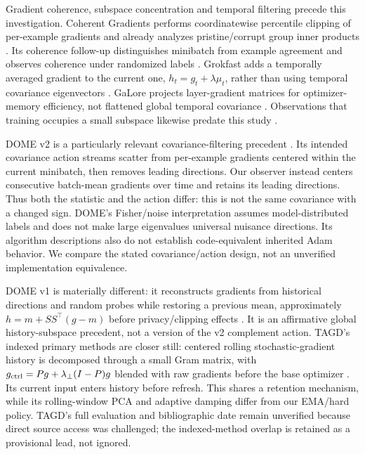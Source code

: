 \documentclass[10pt]{article}
\begin{document}
Gradient coherence, subspace concentration and temporal filtering precede this investigation. Coherent Gradients performs coordinatewise percentile clipping of per-example gradients and already analyzes pristine/corrupt group inner products \citep{chatterjee2020coherent}. Its coherence follow-up distinguishes minibatch from example agreement and observes coherence under randomized labels \citep{chatterjee2020making}. Grokfast adds a temporally averaged gradient to the current one, $h_t=g_t+\lambda\mu_t$, rather than using temporal covariance eigenvectors \citep{lee2024grokfast}. GaLore projects layer-gradient matrices for optimizer-memory efficiency, not flattened global temporal covariance \citep{zhao2024galore}. Observations that training occupies a small subspace likewise predate this study \citep{gurari2018tiny}.

DOME v2 is a particularly relevant covariance-filtering precedent \citep{nicolas2026dome}. Its intended covariance action streams scatter from per-example gradients centered within the current minibatch, then removes leading directions. Our observer instead centers consecutive batch-mean gradients over time and retains its leading directions. Thus both the statistic and the action differ: this is not the same covariance with a changed sign. DOME's Fisher/noise interpretation assumes model-distributed labels and does not make large eigenvalues universal nuisance directions. Its algorithm descriptions also do not establish code-equivalent inherited Adam behavior. We compare the stated covariance/action design, not an unverified implementation equivalence.

DOME v1 is materially different: it reconstructs gradients from historical directions and random probes while restoring a previous mean, approximately $h=m+SS^\top(g-m)$ before privacy/clipping effects \citep{nicolas2025domev1}. It is an affirmative global history-subspace precedent, not a version of the v2 complement action. TAGD's indexed primary methods are closer still: centered rolling stochastic-gradient history is decomposed through a small Gram matrix, with $g_{\rm ctrl}=Pg+\lambda_\perp(I-P)g$ blended with raw gradients before the base optimizer \citep{anonymousTagd}. Its current input enters history before refresh. This shares a retention mechanism, while its rolling-window PCA and adaptive damping differ from our EMA/hard policy. TAGD's full evaluation and bibliographic date remain unverified because direct source access was challenged; the indexed-method overlap is retained as a provisional lead, not ignored.
\end{document}
